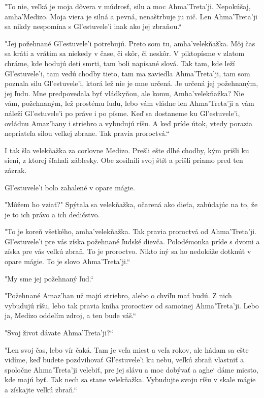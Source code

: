\documentclass{book}
\begin{document}
"$ $To nie, veľká je moja dôvera v múdrosť, silu a moc Ahma'Treta'ji. Nepokúšaj, amha'Medizo. Moja viera je silná a pevná, nenaštrbuje ju nič. Len Ahma'Treta'ji sa nikdy nespomína s Gl'estuvele'i inak ako jej zbraňou.“

"$ $Jej požehnané Gl'estuvele'i potrebujú. Preto som tu, amha'velekňažka. Môj čas sa kráti a vrátim sa niekedy v čase, či skôr, či neskôr. V piktopísme v zlatom chráme, kde hodujú deti smrti, tam boli napísané slová. Tak tam, kde leží Gl'estuvele'i, tam vedú chodby tieto, tam ma zaviedla Ahma'Treta'ji, tam som poznala silu Gl'estuvele'i, ktorá lež nie je mne určená. Je určená jej požehnaným, jej ľudu. Mne predpovedala byť vládkyňou, ale komu, Amha'velekňažka? Nie vám, požehnaným, lež prostému ľudu, lebo vám vládne len Ahma'Treta'ji a vám náleží Gl'estuvele'i po práve i po písme. Keď sa dostaneme ku Gl'estuvele'i, ovládnu Amaz'hany i striebro a vybudujú ríšu. A keď príde útok, vtedy porazia nepriateľa silou veľkej zbrane. Tak pravia proroctvá.“

I tak šla velekňažka za corlovne Medizo. Prešli ešte dlhé chodby, kým prišli ku sieni, z ktorej šľahali záblesky. Obe zosilnili svoj štít a prišli priamo pred ten zázrak.

Gl'estuvele'i bolo zahalené v opare mágie.

"$ $Môžem ho vziať?"$ $ Spýtala sa velekňažka, očarená ako dieťa, zabúdajúc na to, že je to ich právo a ich dedičstvo.

"$ $To je koreň všetkého, amha'velekňažka. Tak pravia proroctvá od Ahma'Treta'ji. Gl'estuvele'i pre vás získa požehnané ľudské dievča. Polodémonka príde s dvomi a získa pre vás veľkú zbraň. To je proroctvo. Nikto iný sa ho nedokáže dotknúť v opare mágie. To je slovo Ahma'Treta'ji.“

"$ $My sme jej požehnaný ľud.“

"$ $Požehnané Amaz'han už majú striebro, alebo o chvíľu mať budú. Z nich vybudujú ríšu, lebo tak pravia kniha proroctiev od samotnej Ahma'Treta'ji. Lebo ja, Medizo oddelím zdroj, a ten bude váš.“

"$ $Svoj život dávate Ahma'Treta'ji?“

"$ $Len svoj čas, lebo vír čaká. Tam je veľa miest a veľa rokov, ale hádam sa ešte vidíme, keď budete pozdvihovať Gl'estuvele'i ku nebu, veľkú zbraň vlastniť a spoločne Ahma'Treta'ji velebiť, pre jej slávu a moc dobývať a aghe‘ dáme miesto, kde majú byť. Tak nech sa stane velekňažka. Vybudujte svoju ríšu v skale mágie a získajte veľkú zbraň.“
\end{document}
